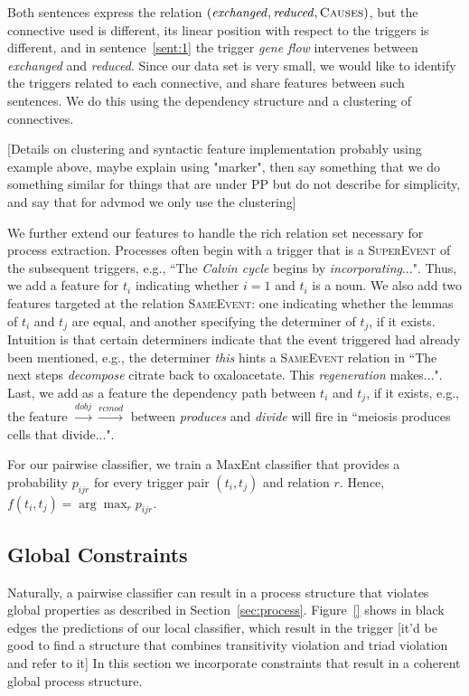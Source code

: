Both sentences express the relation $(\mbox{\emph{exchanged}},\mbox{\emph{reduced}},\mbox{\textsc{Causes}})$, but the connective used is different, its linear position with respect to the triggers is different, and in sentence~\ref{sent:1} the trigger \emph{gene flow} intervenes between \emph{exchanged} and \emph{reduced}. Since our data set is very small, we would like to identify the triggers related to each connective, and share features between such sentences. We do this using the dependency structure and a clustering of connectives.

[Details on clustering and syntactic feature implementation probably using example above, maybe explain using "marker", then say something that we do something similar for things that are under PP but do not describe for simplicity, and say that for advmod we only use the clustering]

We further extend our features to handle the rich relation set necessary for process extraction. Processes often begin with a trigger that is a \textsc{SuperEvent} of the subsequent triggers, e.g., ``The \emph{Calvin cycle} begins by \emph{incorporating}...". Thus, we add a feature for $t_i$ indicating whether $i=1$ and $t_i$  is a noun. We also add two features targeted at the relation \textsc{SameEvent}: one indicating whether the lemmas of $t_i$ and $t_j$ are equal, and another specifying the determiner of $t_j$, if it exists. Intuition is that certain determiners indicate that the event triggered had already been mentioned, e.g., the determiner \emph{this} hints a \textsc{SameEvent} relation in ``The next steps \emph{decompose} citrate back to oxaloacetate. This \emph{regeneration} makes...". Last, we add as a feature the dependency path between $t_i$ and $t_j$, if it exists, e.g., the feature $\xrightarrow{\scriptscriptstyle dobj} \xrightarrow{\scriptscriptstyle rcmod}$ between \emph{produces} and \emph{divide} will fire in ``meiosis produces cells that divide...".

For our pairwise classifier, we train a MaxEnt classifier that provides a probability $p_{ijr}$ for every trigger pair $(t_i,t_j)$ and relation $r$. Hence, $f(t_i,t_j)= \arg\max_r p_{ijr}$.

\subsection{Global Constraints} \label{subsec:global}

Naturally, a pairwise classifier can result in a process structure that violates global properties as described in Section~\ref{sec:process}. Figure~\ref{} shows in black edges the predictions of our local classifier, which result in the trigger [it'd be good to find a structure that combines transitivity violation and triad violation and refer to it] In this section we incorporate constraints that result in a coherent global process structure.

